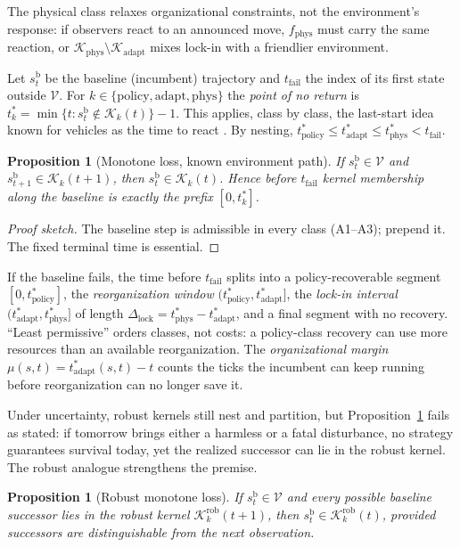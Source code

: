 \documentclass[11pt]{article}
\theoremstyle{plain}
\newtheorem{proposition}[theorem]{Proposition}
\theoremstyle{definition}
\newcommand{\K}{\mathcal{K}}
\newcommand{\V}{\mathcal{V}}
\newcommand{\policy}{\mathrm{policy}}
\newcommand{\adapt}{\mathrm{adapt}}
\newcommand{\phys}{\mathrm{phys}}
\newcommand{\fail}{\mathrm{fail}}
\begin{document}
The physical class relaxes organizational constraints, not the environment's response: if observers react to an announced move, $f_\phys$ must carry the same reaction, or $\K_\phys\setminus\K_\adapt$ mixes lock-in with a friendlier environment.

Let $s^{\mathrm b}_t$ be the baseline (incumbent) trajectory and $t_\fail$ the index of its first state outside $\V$. For $k\in\{\policy,\adapt,\phys\}$ the \emph{point of no return} is $t^*_k=\min\{t: s^{\mathrm b}_t\notin\K_k(t)\}-1$. This applies, class by class, the last-start idea known for vehicles as the time to react \citep{SoentgesEtAl2018}. By nesting, $t^*_\policy\le t^*_\adapt\le t^*_\phys<t_\fail$.

\begin{proposition}[Monotone loss, known environment path]\label{prop:monotone}
If $s^{\mathrm b}_t\in\V$ and $s^{\mathrm b}_{t+1}\in\K_k(t+1)$, then $s^{\mathrm b}_t\in\K_k(t)$. Hence before $t_\fail$ kernel membership along the baseline is exactly the prefix $[0,t^*_k]$.
\end{proposition}
\begin{proof}[Proof sketch]
The baseline step is admissible in every class (A1--A3); prepend it. The fixed terminal time is essential.
\end{proof}

If the baseline fails, the time before $t_\fail$ splits into a policy-recoverable segment $[0,t^*_\policy]$, the \emph{reorganization window} $(t^*_\policy,t^*_\adapt]$, the \emph{lock-in interval} $(t^*_\adapt,t^*_\phys]$ of length $\Delta_{\mathrm{lock}}=t^*_\phys-t^*_\adapt$, and a final segment with no recovery. ``Least permissive'' orders classes, not costs: a policy-class recovery can use more resources than an available reorganization. The \emph{organizational margin} $\mu(s,t)=t^*_\adapt(s,t)-t$ counts the ticks the incumbent can keep running before reorganization can no longer save it.

Under uncertainty, robust kernels still nest and partition, but Proposition~\ref{prop:monotone} fails as stated: if tomorrow brings either a harmless or a fatal disturbance, no strategy guarantees survival today, yet the realized successor can lie in the robust kernel. The robust analogue strengthens the premise.

\begin{proposition}[Robust monotone loss]\label{prop:robust}
If $s^{\mathrm b}_t\in\V$ and every possible baseline successor lies in the robust kernel $\K^{\mathrm{rob}}_k(t+1)$, then $s^{\mathrm b}_t\in\K^{\mathrm{rob}}_k(t)$, provided successors are distinguishable from the next observation.
\end{proposition}
\end{document}
